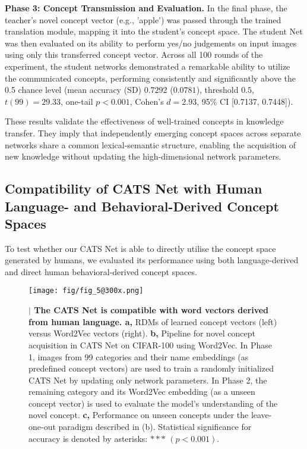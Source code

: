 \documentclass[pdflatex,sn-mathphys-num,lineno]{sn-jnl}%
\begin{document}
\begin{CJK}{UTF8}{gbsn}
\textbf{Phase 3: Concept Transmission and Evaluation.}
In the final phase, the teacher's novel concept vector (e.g., 'apple') was passed through the trained translation module, mapping it into the student's concept space. The student Net was then evaluated on its ability to perform yes/no judgements on input images using only this transferred concept vector. Across all 100 rounds of the experiment, the student networks demonstrated a remarkable ability to utilize the communicated concepts, performing consistently and significantly above the 0.5 chance level (mean accuracy (SD) $0.7292$ ($0.0781$), threshold $0.5$, $t(99)=29.33$, one-tail $p < 0.001$, Cohen's $d=2.93$, 95\% CI [0.7137, 0.7448]).

These results validate the effectiveness of well-trained concepts in knowledge transfer. They imply that independently emerging concept spaces across separate networks share a common lexical-semantic structure, enabling the acquisition of new knowledge without updating the high-dimensional network parameters.

\subsection{Compatibility of CATS Net with Human Language- and Behavioral-Derived Concept Spaces} 

To test whether our CATS Net is able to directly utilise the concept space generated by humans, we evaluated its performance using both language-derived and direct human behavioral-derived concept spaces.

\begin{figure}[htbp]
\centering
\texttt{[image: fig/fig\_5@300x.png]}
\caption{\textbf{$\vert$ The CATS Net is compatible with word vectors derived from human language. a, }RDMs of learned concept vectors (left) versus Word2Vec vectors (right). \textbf{b,} Pipeline for novel concept acquisition in CATS Net on CIFAR-100 using Word2Vec. In Phase 1, images from 99 categories and their name embeddings (as predefined concept vectors) are used to train a randomly initialized CATS Net by updating only network parameters. In Phase 2, the remaining category and its Word2Vec embedding (as a unseen concept vector) is used to evaluate the model’s understanding of the novel concept. \textbf{c,} Performance on unseen concepts under the leave-one-out paradigm described in (b). Statistical significance for accuracy is denoted by asterisks: $***$ $(p < 0.001)$.}
\label{fig5}
\end{figure}


\end{CJK}
\end{document}
